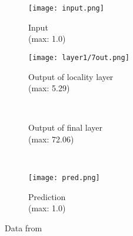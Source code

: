 \begin{figure}[h]
	\centering
	\graphicspath{{resources/models/3neurEx/fullRun/invert/}}
	\begin{subfigure}{.16\textwidth}
		\centering
		\texttt{[image: input.png]}
		\caption{Input\\(max: 1.0)}
	\end{subfigure}
	\begin{minipage}{.5\textwidth}
		\centering
		\begin{subfigure}{.8\textwidth}
			\centering
			\texttt{[image: layer1/7out.png]}
			\caption{Output of locality layer\\(max: 5.29)}
		\end{subfigure}\\
		\vfill
		\begin{subfigure}{.8\textwidth}
			\centering
			\caption{Output of final layer\\(max: 72.06)}
		\end{subfigure}
	\end{minipage}
	\begin{minipage}{.25\textwidth}
		\centering
		\vspace{-10pt}
		\hspace{-20pt}
		\\
		\vspace{2em}
		\begin{subfigure}{\textwidth}
			\centering
			\texttt{[image: pred.png]}
			\caption{Prediction\\(max: 1.0)}
		\end{subfigure}
	\end{minipage}
	\caption{Data from }
	\label{fig:invertrun}
\end{figure}
		


